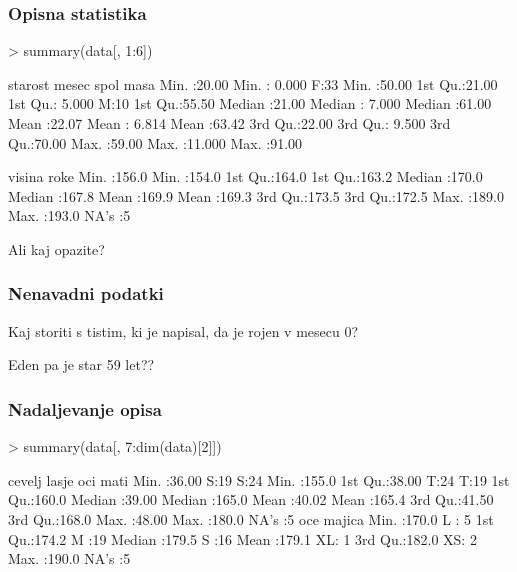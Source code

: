 \begin{frame}[fragile]
\frametitle{Opisna statistika}
\begin{Schunk}
\begin{Sinput}
> summary(data[, 1:6])
\end{Sinput}
\begin{Soutput}
    starost          mesec        spol        masa      
 Min.   :20.00   Min.   : 0.000   F:33   Min.   :50.00  
 1st Qu.:21.00   1st Qu.: 5.000   M:10   1st Qu.:55.50  
 Median :21.00   Median : 7.000          Median :61.00  
 Mean   :22.07   Mean   : 6.814          Mean   :63.42  
 3rd Qu.:22.00   3rd Qu.: 9.500          3rd Qu.:70.00  
 Max.   :59.00   Max.   :11.000          Max.   :91.00  
                                                        
     visina           roke      
 Min.   :156.0   Min.   :154.0  
 1st Qu.:164.0   1st Qu.:163.2  
 Median :170.0   Median :167.8  
 Mean   :169.9   Mean   :169.3  
 3rd Qu.:173.5   3rd Qu.:172.5  
 Max.   :189.0   Max.   :193.0  
                 NA's   :5      
\end{Soutput}
\end{Schunk}
Ali kaj opazite?
\end{frame}
\begin{frame}[fragile]
\frametitle{Nenavadni podatki}
Kaj storiti s tistim, ki je napisal, da je rojen v mesecu 0?

Eden pa je star 59 let??
\end{frame}


\begin{frame}[fragile]
\frametitle{Nadaljevanje opisa}
\begin{Schunk}
\begin{Sinput}
> summary(data[, 7:dim(data)[2]])
\end{Sinput}
\begin{Soutput}
     cevelj      lasje  oci         mati      
 Min.   :36.00   S:19   S:24   Min.   :155.0  
 1st Qu.:38.00   T:24   T:19   1st Qu.:160.0  
 Median :39.00                 Median :165.0  
 Mean   :40.02                 Mean   :165.4  
 3rd Qu.:41.50                 3rd Qu.:168.0  
 Max.   :48.00                 Max.   :180.0  
                               NA's   :5      
      oce        majica 
 Min.   :170.0   L : 5  
 1st Qu.:174.2   M :19  
 Median :179.5   S :16  
 Mean   :179.1   XL: 1  
 3rd Qu.:182.0   XS: 2  
 Max.   :190.0          
 NA's   :5              
\end{Soutput}
\end{Schunk}
\end{frame}

